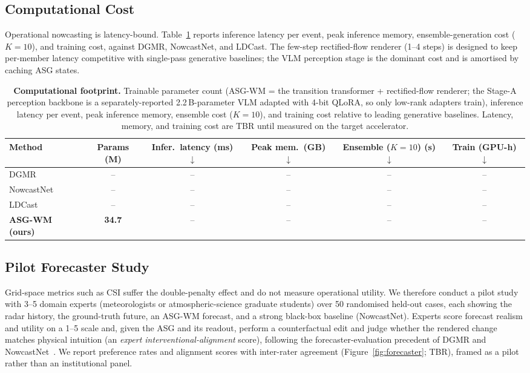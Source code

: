 \documentclass[fleqn,10pt]{wlscirep}
\begin{document}
\subsection*{Computational Cost}

Operational nowcasting is latency-bound.
Table~\ref{tab:compute} reports inference latency per event, peak inference memory, ensemble-generation cost ($K{=}10$), and training cost, against DGMR, NowcastNet, and LDCast.
The few-step rectified-flow renderer (1--4 steps) is designed to keep per-member latency competitive with single-pass generative baselines; the VLM perception stage is the dominant cost and is amortised by caching ASG states.

\begin{table}[ht]
\centering
\caption{\textbf{Computational footprint.}
Trainable parameter count (ASG-WM = the transition transformer + rectified-flow renderer; the Stage-A perception backbone is a separately-reported 2.2\,B-parameter VLM adapted with 4-bit QLoRA, so only low-rank adapters train), inference latency per event, peak inference memory, ensemble cost ($K{=}10$), and training cost relative to leading generative baselines. Latency, memory, and training cost are TBR until measured on the target accelerator.}
\label{tab:compute}
\small
\begin{tabular}{@{}lccccc@{}}
\toprule
Method & Params (M) & Infer.\ latency (ms) $\downarrow$ & Peak mem.\ (GB) $\downarrow$ & Ensemble ($K{=}10$) (s) $\downarrow$ & Train (GPU-h) $\downarrow$ \\
\midrule
DGMR~\cite{ravuri2021dgmr} & -- & -- & -- & -- & -- \\
NowcastNet~\cite{zhang2023nowcastnet} & -- & -- & -- & -- & -- \\
LDCast~\cite{leinonen2023ldcast} & -- & -- & -- & -- & -- \\
\textbf{ASG-WM (ours)} & \textbf{34.7} & -- & -- & -- & -- \\
\bottomrule
\end{tabular}
\end{table}

\subsection*{Pilot Forecaster Study}

Grid-space metrics such as CSI suffer the double-penalty effect and do not measure operational utility.
We therefore conduct a pilot study with 3--5 domain experts (meteorologists or atmospheric-science graduate students) over 50 randomised held-out cases, each showing the radar history, the ground-truth future, an ASG-WM forecast, and a strong black-box baseline (NowcastNet).
Experts score forecast realism and utility on a 1--5 scale and, given the ASG and its readout, perform a counterfactual edit and judge whether the rendered change matches physical intuition (an \emph{expert interventional-alignment} score), following the forecaster-evaluation precedent of DGMR and NowcastNet~\cite{ravuri2021dgmr,zhang2023nowcastnet}.
We report preference rates and alignment scores with inter-rater agreement (Figure~\ref{fig:forecaster}; TBR), framed as a pilot rather than an institutional panel.
\end{document}
